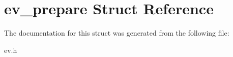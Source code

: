 \hypertarget{structev__prepare}{}\section{ev\+\_\+prepare Struct Reference}
\label{structev__prepare}


The documentation for this struct was generated from the following file\+:\begin{DoxyCompactItemize}
\item 
ev.\+h\end{DoxyCompactItemize}
